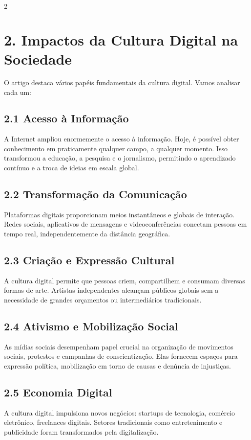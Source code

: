 \documentclass[12pt]{article}
\begin{document}
\begin{multicols}{2}
\section*{2. Impactos da Cultura Digital na Sociedade}
O artigo destaca vários papéis fundamentais da cultura digital. Vamos analisar cada um:

\subsection*{2.1 Acesso à Informação}
A Internet ampliou enormemente o acesso à informação. Hoje, é possível obter conhecimento em praticamente qualquer campo, a qualquer momento. Isso transformou a educação, a pesquisa e o jornalismo, permitindo o aprendizado contínuo e a troca de ideias em escala global.

\subsection*{2.2 Transformação da Comunicação}
Plataformas digitais proporcionam meios instantâneos e globais de interação. Redes sociais, aplicativos de mensagens e videoconferências conectam pessoas em tempo real, independentemente da distância geográfica.

\subsection*{2.3 Criação e Expressão Cultural}
A cultura digital permite que pessoas criem, compartilhem e consumam diversas formas de arte. Artistas independentes alcançam públicos globais sem a necessidade de grandes orçamentos ou intermediários tradicionais.

\subsection*{2.4 Ativismo e Mobilização Social}
As mídias sociais desempenham papel crucial na organização de movimentos sociais, protestos e campanhas de conscientização. Elas fornecem espaços para expressão política, mobilização em torno de causas e denúncia de injustiças.

\subsection*{2.5 Economia Digital}
A cultura digital impulsiona novos negócios: startups de tecnologia, comércio eletrônico, freelances digitais. Setores tradicionais como entretenimento e publicidade foram transformados pela digitalização.


\end{multicols}
\end{document}
